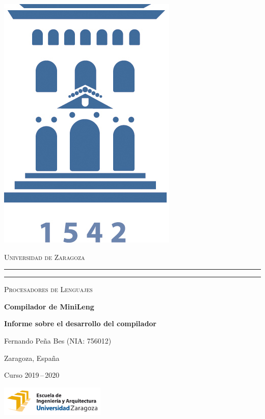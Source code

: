 \documentclass[a4paper,10pt]{article}
\begin{document}
\begin{titlepage}
    \centering
    \includegraphics[width=1 cm]{logoUZ.jpg}

    \textsc{\large Universidad de Zaragoza}
    \rule{\textwidth}{1.6pt}\vspace*{-\baselineskip}\vspace*{2pt} %
    \rule{\textwidth}{0.4pt} %

    \vfill

    {\LARGE \scshape Procesadores de Lenguajes}

    \vspace{2cm}

    {\bfseries \Huge Compilador de MiniLeng}

    \vspace{.5cm}

    {\bfseries \Large Informe sobre el desarrollo del compilador}

    \vspace{3cm}





    {\large Fernando Peña Bes (NIA: 756012)}

    \vfill

    \large{Zaragoza, España}

    {Curso 2019\,--\,2020}

    \vfill

    \includegraphics[width=5.0cm]{EINA.png}

\end{titlepage}




\tableofcontents

\pagebreak

\setcounter{page}{1}

\pagestyle{fancy}







\pagebreak


\renewcommand\appendixname{Anexo}

\begin{appendices}
\pagebreak

% 
\end{appendices}

\clearpage{}
\newpage
\nocite{*}
\printbibliography
\end{document}
